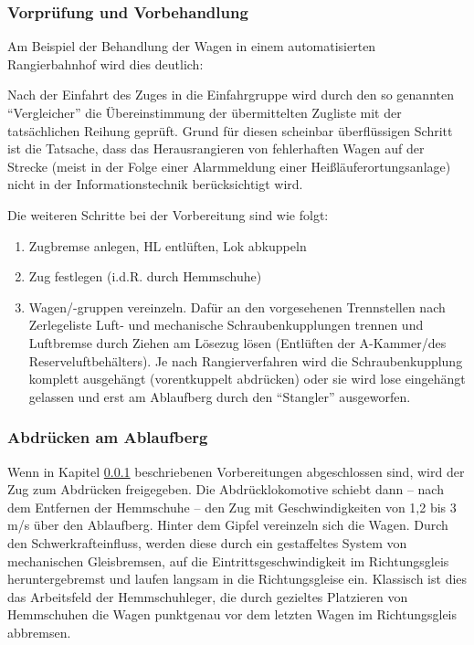 \subsubsection{Vorprüfung und Vorbehandlung}\label{sec:Vorpruefung}
Am Beispiel der Behandlung der Wagen in einem automatisierten \gls{Rangierbahnhof} wird dies deutlich:\par
Nach der Einfahrt des Zuges in die Einfahrgruppe wird durch den so genannten "`Vergleicher"' die Übereinstimmung der übermittelten Zugliste mit der tatsächlichen Reihung geprüft. Grund für diesen scheinbar überflüssigen Schritt ist die Tatsache, dass das Herausrangieren von fehlerhaften Wagen auf der Strecke (meist in der Folge einer Alarmmeldung einer Heißläuferortungsanlage) nicht in der Informationstechnik berücksichtigt wird.\par
Die weiteren Schritte bei der Vorbereitung sind wie folgt:
\begin{enumerate}
    \item Zugbremse anlegen, \acrshort{HL} entlüften, Lok abkuppeln
    \item Zug festlegen (i.d.R. durch \gls{Hemmschuh}e)
    \item Wagen/-gruppen vereinzeln. Dafür an den vorgesehenen Trennstellen nach Zerlegeliste Luft- und mechanische Schraubenkupplungen trennen und Luftbremse durch Ziehen am Lösezug lösen (Entlüften der A-Kammer/des Reserveluftbehälters). Je nach Rangierverfahren wird die Schraubenkupplung komplett ausgehängt (vorentkuppelt abdrücken) oder sie wird lose eingehängt gelassen und erst am \gls{Ablaufberg} durch den "`Stangler"' ausgeworfen.
\end{enumerate}
\subsubsection{Abdrücken am Ablaufberg}\label{sec:Abdruecken}
Wenn in Kapitel \ref{sec:Vorpruefung} beschriebenen Vorbereitungen abgeschlossen sind, wird der Zug zum Abdrücken freigegeben. Die Abdrücklokomotive schiebt dann -- nach dem Entfernen der Hemmschuhe -- den Zug mit Geschwindigkeiten von 1,2 bis 3 m/s %
über den \gls{Ablaufberg}. Hinter dem Gipfel vereinzeln sich die Wagen. Durch den Schwerkrafteinfluss, werden diese durch ein gestaffeltes System von mechanischen Gleisbremsen, auf die Eintrittsgeschwindigkeit im Richtungsgleis heruntergebremst und laufen langsam in die Richtungsgleise ein.  Klassisch ist dies das Arbeitsfeld der Hemmschuhleger, die durch gezieltes Platzieren von Hemmschuhen die Wagen punktgenau vor dem letzten Wagen im Richtungsgleis abbremsen.
